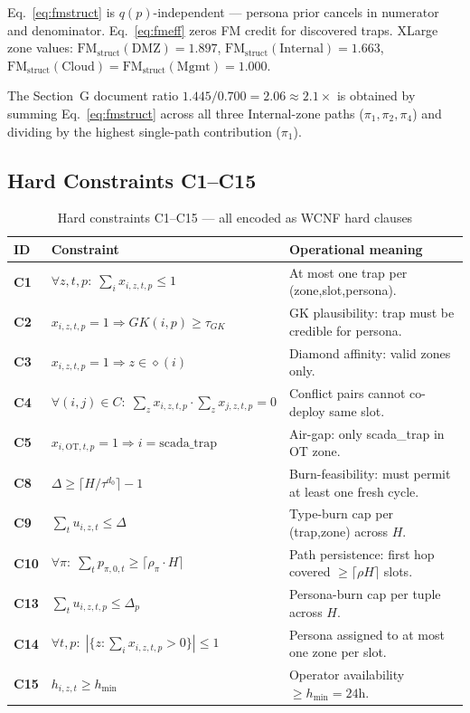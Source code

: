 \documentclass[12pt,a4paper]{article}
\newcommand{\hdr}[1]{\cellcolor{HeaderBg}\color{white}\bfseries #1}
\newcommand{\xiztp}{x_{i,z,t,p}}
\newcommand{\FMst}{\mathrm{FM}_{\mathrm{struct}}}
\begin{document}
Eq.~\eqref{eq:fmstruct} is $q(p)$-independent — persona prior cancels in numerator and
denominator. Eq.~\eqref{eq:fmeff} zeros FM credit for discovered traps.
XLarge zone values: $\FMst(\text{DMZ}){=}1.897$, $\FMst(\text{Internal}){=}1.663$,
$\FMst(\text{Cloud}){=}\FMst(\text{Mgmt}){=}1.000$.

The Section~G document ratio $1.445/0.700{=}2.06{\approx}2.1\times$ is obtained by summing
Eq.~\eqref{eq:fmstruct} across all three Internal-zone paths ($\pi_1,\pi_2,\pi_4$) and
dividing by the highest single-path contribution ($\pi_1$).

\subsection{Hard Constraints C1--C15}
\label{sec:constraints}

\begin{table}[H]
\centering
\small
\caption{Hard constraints C1--C15 — all encoded as WCNF hard clauses}
\label{tab:constraints}
\renewcommand{\arraystretch}{1.3}
\begin{tabularx}{\linewidth}{C{0.9cm} L{5.2cm} X}
\toprule
\hdr{ID} & \hdr{Constraint} & \hdr{Operational meaning} \\
\midrule
{}\textbf{C1} & $\forall z,t,p:\;\sum_i \xiztp \le 1$ & At most one trap per (zone,slot,persona). \\
\textbf{C2} & $\xiztp{=}1\Rightarrow GK(i,p)\ge\tau_{GK}$ & GK plausibility: trap must be credible for persona. \\
\textbf{C3} & $\xiztp{=}1\Rightarrow z\in\diamond(i)$ & Diamond affinity: valid zones only. \\
\textbf{C4} & $\forall(i,j)\in C:\;\sum_z x_{i,z,t,p}{\cdot}\sum_z x_{j,z,t,p}{=}0$ & Conflict pairs cannot co-deploy same slot. \\
\textbf{C5} & $x_{i,\text{OT},t,p}{=}1\Rightarrow i{=}\text{scada\_trap}$ & Air-gap: only scada\_trap in OT zone. \\
\textbf{C8} & $\Delta\ge\lceil H/\tau^{d_0}\rceil{-}1$ & Burn-feasibility: must permit at least one fresh cycle. \\
\textbf{C9} & $\sum_t u_{i,z,t}\le\Delta$ & Type-burn cap per (trap,zone) across $H$. \\
\textbf{C10} & $\forall\pi:\;\sum_t p_{\pi,0,t}\ge\lceil\rho_\pi{\cdot}H\rceil$ & Path persistence: first hop covered $\ge\lceil\rho H\rceil$ slots. \\
\textbf{C13} & $\sum_t u_{i,z,t,p}\le\Delta_p$ & Persona-burn cap per tuple across $H$. \\
\textbf{C14} & $\forall t,p:\;|\{z:\sum_i x_{i,z,t,p}{>}0\}|\le 1$ & Persona assigned to at most one zone per slot. \\
\textbf{C15} & $h_{i,z,t}\ge h_{\min}$ & Operator availability $\ge h_{\min}{=}24$h. \\
\bottomrule
\end{tabularx}
\end{table}
\end{document}
